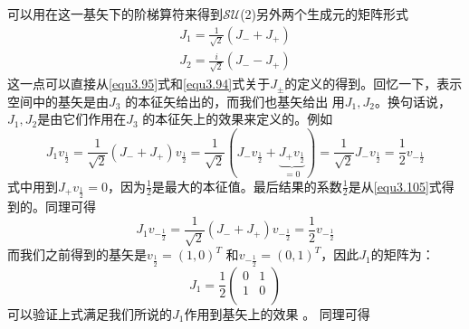 可以用在这一基矢下的阶梯算符来得到$\mathcal{SU}$(2)另外两个生成元的矩阵形式
\begin{align}\label{equ3.115}
  J_1=\frac{1}{\sqrt{2}}(J_-+J_+) \\
\label{equ3.116}
  J_2=\frac{i}{\sqrt{2}}(J_--J_+)
\end{align}
这一点可以直接从\eqref{equ3.95}式和\eqref{equ3.94}式关于$J_\pm$的定义的得到。回忆一下，表示空间中的基矢是由$J_3$ 的本征矢给出的，而我们也基矢给出 用$J_1,J_2$。换句话说，$J_1,J_2$是由它们作用在$J_3$ 的本征矢上的效果来定义的。例如
\begin{equation}\label{equ3.117}
  J_1v_\frac{1}{2}
  =\frac{1}{\sqrt{2}}
  (J_-+J_+)v_\frac{1}{2}
  =\frac{1}{\sqrt{2}}
  (J_-v_\frac{1}{2}
  +\underbrace{J_+v_\frac{1}{2}}_{=0})
  =\frac{1}{\sqrt{2}}J_-v_\frac{1}{2}
  =\frac{1}{2}v_{-\frac{1}{2}}
\end{equation}
式中用到$J_+v_\frac{1}{2}=0$，因为$\frac{1}{2}$是最大的本征值。最后结果的系数$\frac{1}{2}$是从\eqref{equ3.105}式得到的。同理可得
\begin{equation}\label{equ3.118}
  J_1 v_{-\frac{1}{2}}=\frac{1}{\sqrt{2}}(J_-+J_+)v_{-\frac{1}{2}}=\frac{1}{2}v_{-\frac{1}{2}}
\end{equation}
而我们之前得到的基矢是$v_\frac{1}{2}=(1,0)^{{T}}$ 和$v_{-\frac{1}{2}}=(0,1)^{{T}}$，因此$J_1$的矩阵为：
\begin{equation}\label{equ3.119}
  J_1=\frac{1}{2}\left(
                   \begin{array}{cc}
                     0 & 1 \\
                     1 & 0 \\
                   \end{array}
                 \right)
\end{equation}
可以验证上式满足我们所说的$J_1$作用到基矢上的效果
。 同理可得
